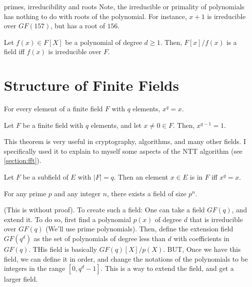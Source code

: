 \begin{bclogo}[logo=\bcinfo, couleurBarre=orange, noborder=true, couleur=white]{primes, irreducibility and roots}
Note, the irreducible or primality of polynomials has nothing to do with roots 
of the polynomial. For instance, $x+1$ is irreducible over $GF(157)$, but has 
a root of $156$.
\end{bclogo}

\begin{theorem}
    Let $f(x)\in F[X]$ be a polynomial of degree $d\ge 1$.
    Then, $F[x]/f(x)$ is a field iff $f(x)$ is irreducible over $F$.
\end{theorem}


\section{Structure of Finite Fields}




\begin{theorem}\label{fermats-little-theorem}
    For every element of a finite field $F$ with $q$ elements, 
    $x^q=x$. 
\end{theorem}

\begin{corollary}
    Let $F$ be a finite field with $q$ elements, and let $x\ne0\in F$.
    Then, $x^{q-1}=1$.
\end{corollary}

This theorem is very useful in cryptography, algorithms, and many other fields.
I specifically used it to explain to myself some aspects of the NTT algorithm (see \autoref{section:fft}). 


\begin{corollary}
    Let $F$ be a subfield of $E$ with $|F|=q$. Then 
    an element $x\in E$ is in $F$ iff $x^q=x$.
\end{corollary}



\begin{theorem}
    For any prime $p$ and any integer $n$, there exists a field of size $p^n$.
\end{theorem}

(This is without proof). 
To create such a field:
One can take a field $GF(q)$, and extend it.
To do so, first find a polynomial $p(x)$ of degree $d$ that is irreducible over $GF(q)$
(We'll use prime polynomials).
Then, define the extension field $GF(q^d)$ as the set of polynomials of degree less than $d$ with coefficients in $GF(q)$.
THis field is basically $GF(q)[X]/p(X)$. BUT, Once we have this field, 
we can define it in order, and change the notations of the polynomials to be integers 
in the range $[0,q^d-1]$. This is a way to extend the field, and get a larger field.



